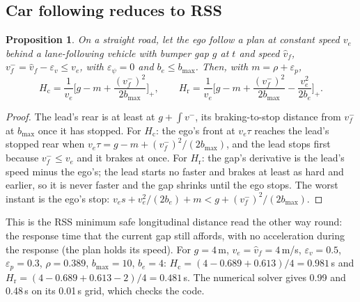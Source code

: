 \documentclass[11pt]{article}
\newtheorem{proposition}{Proposition}
\theoremstyle{definition}
\theoremstyle{remark}
\newcommand{\Hc}{H_{\mathrm{c}}}
\newcommand{\Hr}{H_{\mathrm{r}}}
\begin{document}
\subsection{Car following reduces to RSS}
\begin{proposition}\label{prop:rss}
On a straight road, let the ego follow a plan at constant speed $v_e$ behind a lane-following vehicle
with bumper gap $g$ at $t$ and speed $\hat v_f$, $v_f^-=\hat v_f-\varepsilon_v\le v_e$, with
$\varepsilon_\psi=0$ and $b_e\le b_{\max}$. Then, with $m=\rho+\varepsilon_p$,
\[
\Hc=\frac{1}{v_e}\Big[g-m+\frac{(v_f^-)^2}{2b_{\max}}\Big]_+,\qquad
\Hr=\frac{1}{v_e}\Big[g-m+\frac{(v_f^-)^2}{2b_{\max}}-\frac{v_e^2}{2b_e}\Big]_+ .
\]
\end{proposition}
\begin{proof}
The lead's rear is at least at $g+\int v^-$, its braking-to-stop distance from $v_f^-$ at $b_{\max}$
once it has stopped. For $\Hc$: the ego's front at $v_e\tau$ reaches the lead's stopped rear when
$v_e\tau=g-m+(v_f^-)^2/(2b_{\max})$, and the lead stops first because $v_f^-\le v_e$ and it brakes at once.
For $\Hr$: the gap's derivative is the lead's speed minus the ego's; the lead starts no faster and brakes at
least as hard and earlier, so it is never faster and the gap shrinks until the ego stops. The worst instant
is the ego's stop: $v_es+v_e^2/(2b_e)+m<g+(v_f^-)^2/(2b_{\max})$.
\end{proof}
This is the RSS minimum safe longitudinal distance \cite{rss2017} read the other way round: the response
time that the current gap still affords, with no acceleration during the response (the plan holds its
speed). For $g=4$\,m, $v_e=\hat v_f=4$\,m/s, $\varepsilon_v=0.5$, $\varepsilon_p=0.3$, $\rho=0.389$,
$b_{\max}=10$, $b_e=4$: $\Hc=(4-0.689+0.613)/4=0.981$\,s and $\Hr=(4-0.689+0.613-2)/4=0.481$\,s. The
numerical solver gives 0.99 and 0.48\,s on its 0.01\,s grid, which checks the code.
\end{document}
